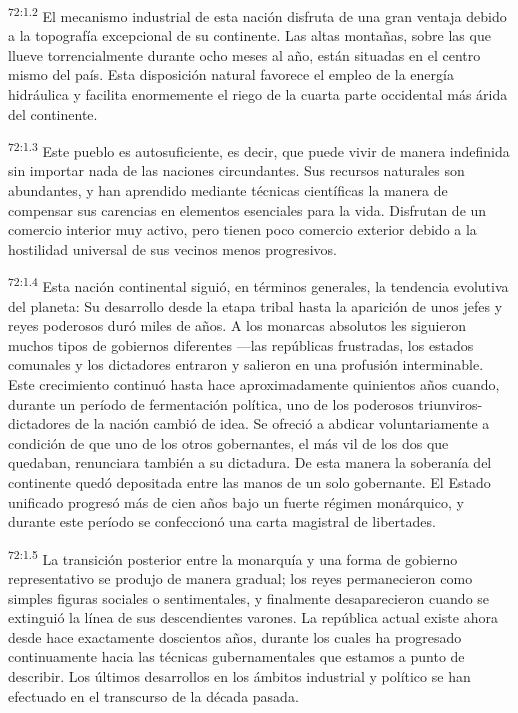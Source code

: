 \par
\textsuperscript{72:1.2} El mecanismo industrial de esta nación disfruta de una gran ventaja debido a la topografía excepcional de su continente. Las altas montañas, sobre las que llueve torrencialmente durante ocho meses al año, están situadas en el centro mismo del país. Esta disposición natural favorece el empleo de la energía hidráulica y facilita enormemente el riego de la cuarta parte occidental más árida del continente.

\par
\textsuperscript{72:1.3} Este pueblo es autosuficiente, es decir, que puede vivir de manera indefinida sin importar nada de las naciones circundantes. Sus recursos naturales son abundantes, y han aprendido mediante técnicas científicas la manera de compensar sus carencias en elementos esenciales para la vida. Disfrutan de un comercio interior muy activo, pero tienen poco comercio exterior debido a la hostilidad universal de sus vecinos menos progresivos.

\par
\textsuperscript{72:1.4} Esta nación continental siguió, en términos generales, la tendencia evolutiva del planeta: Su desarrollo desde la etapa tribal hasta la aparición de unos jefes y reyes poderosos duró miles de años. A los monarcas absolutos les siguieron muchos tipos de gobiernos diferentes ---las repúblicas frustradas, los estados comunales y los dictadores entraron y salieron en una profusión interminable. Este crecimiento continuó hasta hace aproximadamente quinientos años cuando, durante un período de fermentación política, uno de los poderosos triunviros-dictadores de la nación cambió de idea. Se ofreció a abdicar voluntariamente a condición de que uno de los otros gobernantes, el más vil de los dos que quedaban, renunciara también a su dictadura. De esta manera la soberanía del continente quedó depositada entre las manos de un solo gobernante. El Estado unificado progresó más de cien años bajo un fuerte régimen monárquico, y durante este período se confeccionó una carta magistral de libertades.

\par
\textsuperscript{72:1.5} La transición posterior entre la monarquía y una forma de gobierno representativo se produjo de manera gradual; los reyes permanecieron como simples figuras sociales o sentimentales, y finalmente desaparecieron cuando se extinguió la línea de sus descendientes varones. La república actual existe ahora desde hace exactamente doscientos años, durante los cuales ha progresado continuamente hacia las técnicas gubernamentales que estamos a punto de describir. Los últimos desarrollos en los ámbitos industrial y político se han efectuado en el transcurso de la década pasada.

